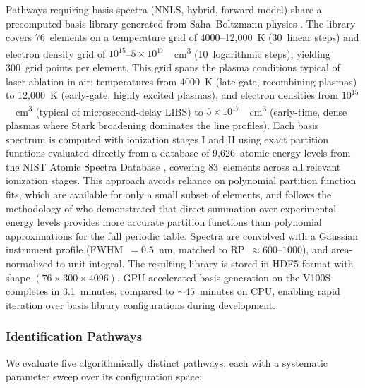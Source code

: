 Pathways requiring basis spectra (NNLS, hybrid, forward model) share a precomputed basis library generated from Saha--Boltzmann physics \citep{Ciucci1999,Tognoni2010}.
The library covers 76~elements on a temperature grid of 4000--12{,}000~K (30~linear steps) and electron density grid of $10^{15}$--$5 \times 10^{17}$~\si{\per\cubic\centi\metre} (10~logarithmic steps), yielding 300~grid points per element.
This grid spans the plasma conditions typical of laser ablation in air: temperatures from 4000~K (late-gate, recombining plasmas) to 12{,}000~K (early-gate, highly excited plasmas), and electron densities from $10^{15}$~\si{\per\cubic\centi\metre} (typical of microsecond-delay LIBS) to $5 \times 10^{17}$~\si{\per\cubic\centi\metre} (early-time, dense plasmas where Stark broadening dominates the line profiles).
Each basis spectrum is computed with ionization stages I and II using exact partition functions evaluated directly from a database of 9{,}626~atomic energy levels from the NIST Atomic Spectra Database \citep{Kramida2024}, covering 83~elements across all relevant ionization stages.
This approach avoids reliance on polynomial partition function fits, which are available for only a small subset of elements, and follows the methodology of \citet{Barklem2016} who demonstrated that direct summation over experimental energy levels provides more accurate partition functions than polynomial approximations for the full periodic table.
Spectra are convolved with a Gaussian instrument profile (FWHM~$= 0.5$~nm, matched to RP~$\approx 600$--$1000$), and area-normalized to unit integral.
The resulting library is stored in HDF5 format with shape $(76 \times 300 \times 4096)$.
GPU-accelerated basis generation on the V100S completes in 3.1~minutes, compared to ${\sim}45$~minutes on CPU, enabling rapid iteration over basis library configurations during development.

\subsubsection{Identification Pathways}
\label{sec:id-pathways}

We evaluate five algorithmically distinct pathways, each with a systematic parameter sweep over its configuration space:

